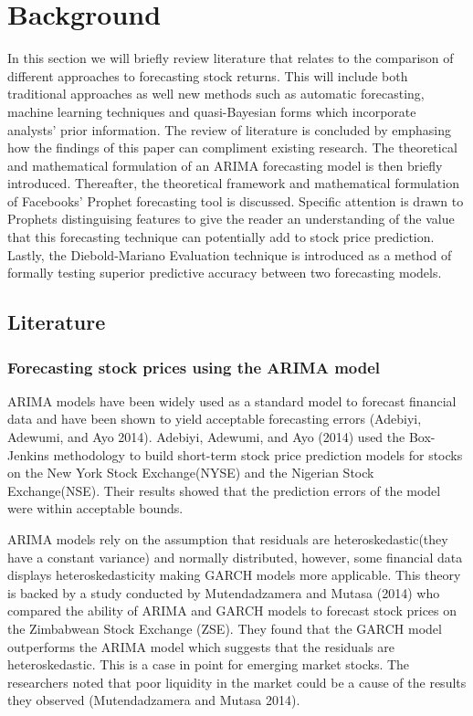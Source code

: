 \documentclass[12pt,a4paper]{article}
\numberwithin{equation}{section}
\numberwithin{figure}{section}
\numberwithin{table}{section}
\begin{document}
\section{Background}\label{background}

In this section we will briefly review literature that relates to the
comparison of different approaches to forecasting stock returns. This
will include both traditional approaches as well new methods such as
automatic forecasting, machine learning techniques and quasi-Bayesian
forms which incorporate analysts' prior information. The review of
literature is concluded by emphasing how the findings of this paper can
compliment existing research. The theoretical and mathematical
formulation of an ARIMA forecasting model is then briefly introduced.
Thereafter, the theoretical framework and mathematical formulation of
Facebooks' Prophet forecasting tool is discussed. Specific attention is
drawn to Prophets distinguising features to give the reader an
understanding of the value that this forecasting technique can
potentially add to stock price prediction. Lastly, the Diebold-Mariano
Evaluation technique is introduced as a method of formally testing
superior predictive accuracy between two forecasting models.

\subsection{Literature}\label{literature}

\subsubsection{Forecasting stock prices using the ARIMA
model}\label{forecasting-stock-prices-using-the-arima-model}

ARIMA models have been widely used as a standard model to forecast
financial data and have been shown to yield acceptable forecasting
errors (Adebiyi, Adewumi, and Ayo 2014). Adebiyi, Adewumi, and Ayo
(2014) used the Box-Jenkins methodology to build short-term stock price
prediction models for stocks on the New York Stock Exchange(NYSE) and
the Nigerian Stock Exchange(NSE). Their results showed that the
prediction errors of the model were within acceptable bounds.

ARIMA models rely on the assumption that residuals are
heteroskedastic(they have a constant variance) and normally distributed,
however, some financial data displays heteroskedasticity making GARCH
models more applicable. This theory is backed by a study conducted by
Mutendadzamera and Mutasa (2014) who compared the ability of ARIMA and
GARCH models to forecast stock prices on the Zimbabwean Stock Exchange
(ZSE). They found that the GARCH model outperforms the ARIMA model which
suggests that the residuals are heteroskedastic. This is a case in point
for emerging market stocks. The researchers noted that poor liquidity in
the market could be a cause of the results they observed (Mutendadzamera
and Mutasa 2014).
\end{document}

